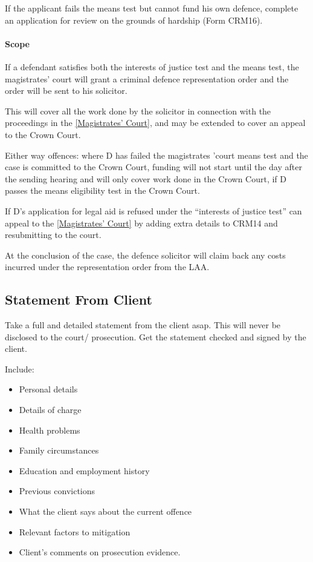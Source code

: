 \documentclass[
]{article}
\providecommand{\tightlist}{%
  \setlength{\itemsep}{0pt}\setlength{\parskip}{0pt}}
\begin{document}
If the applicant fails the means test but cannot fund his own defence,
complete an application for review on the grounds of hardship (Form
CRM16).

\hypertarget{scope}{%
\paragraph{Scope}\label{scope}}

If a defendant satisfies both the interests of justice test and the
means test, the magistrates' court will grant a criminal defence
representation order and the order will be sent to his solicitor.

This will cover all the work done by the solicitor in connection with
the proceedings in the
\href{maximum\%20compensation\%20of\%20£5,000\%20per\%20offence}{{[}Magistrates'
Court{]}}, and may be extended to cover an appeal to the Crown Court.

Either way offences: where D has failed the magistrates 'court means
test and the case is committed to the Crown Court, funding will not
start until the day after the sending hearing and will only cover work
done in the Crown Court, if D passes the means eligibility test in the
Crown Court.

If D's application for legal aid is refused under the ``interests of
justice test'' can appeal to the
\href{maximum\%20compensation\%20of\%20£5,000\%20per\%20offence}{{[}Magistrates'
Court{]}} by adding extra details to CRM14 and resubmitting to the
court.

At the conclusion of the case, the defence solicitor will claim back any
costs incurred under the representation order from the LAA.

\hypertarget{statement-from-client}{%
\subsection{Statement From Client}\label{statement-from-client}}

Take a full and detailed statement from the client asap. This will never
be disclosed to the court/ prosecution. Get the statement checked and
signed by the client.

Include:

\begin{itemize}
\tightlist
\item
  Personal details
\item
  Details of charge
\item
  Health problems
\item
  Family circumstances
\item
  Education and employment history
\item
  Previous convictions
\item
  What the client says about the current offence
\item
  Relevant factors to mitigation
\item
  Client's comments on prosecution evidence.
\end{itemize}
\end{document}
